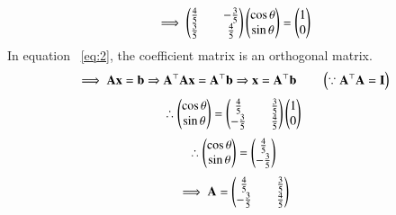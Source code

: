 \documentclass[journal]{IEEEtran}
\begin{document}
\begin{align}
    \implies \begin{pmatrix}\tfrac{4}{5}&&-\tfrac{3}{5}\\\tfrac{3}{5}&&\tfrac{4}{5}\end{pmatrix}\begin{pmatrix}\cos{\theta}\\\sin{\theta}\end{pmatrix}=\begin{pmatrix}1\\0\end{pmatrix}
    \label{eq:2}
\end{align}
In equation ~\eqref{eq:2}, the coefficient matrix is an orthogonal matrix.
\begin{align}
    \implies \mathbf{A}\mathbf{x}=\mathbf{b} 
    \Rightarrow 
    \mathbf{A}^{\top}\mathbf{A}\mathbf{x}=\mathbf{A}^{\top}\mathbf{b}
    \Rightarrow
    \mathbf{x}=\mathbf{A}^{\top}\mathbf{b} \qquad \left(\because \mathbf{A}^{\top}\mathbf{A}=\mathbf{I}\right)
\end{align}
\begin{align}
    \therefore \begin{pmatrix}\cos{\theta}\\\sin{\theta}\end{pmatrix}=\begin{pmatrix}\tfrac{4}{5}&&\tfrac{3}{5}\\-\tfrac{3}{5}&&\tfrac{4}{5}\end{pmatrix}\begin{pmatrix}1\\0\end{pmatrix}
\end{align}
\begin{align}
    \therefore \begin{pmatrix}\cos{\theta}\\\sin{\theta}\end{pmatrix}=\begin{pmatrix}\tfrac{4}{5}\\-\tfrac{3}{5}\end{pmatrix}
\end{align}
\begin{align}
    \implies \mathbf{A}=\begin{pmatrix}\tfrac{4}{5}&&\tfrac{3}{5}\\-\tfrac{3}{5}&&\tfrac{4}{5}\end{pmatrix}
\end{align}
\end{document}

